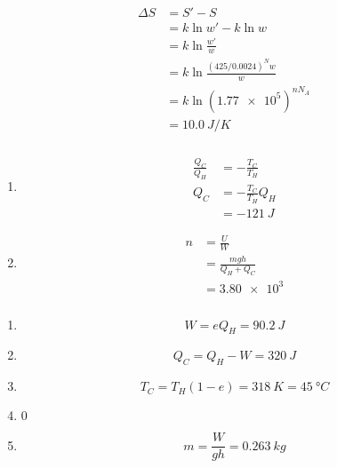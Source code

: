 \documentclass{article}
\begin{document}
\setcounter{subsubsection}{28}
\subsubsection{}

\begin{align*}
  \Delta S & = S' - S                             \\
           & = k \ln w' - k \ln w                 \\
           & = k \ln \frac{w'}{w}                 \\
           & = k \ln \frac{(425 / 0.0024)^N w}{w} \\
           & = k \ln (\num{1.77e5})^{n N_A}       \\
           & = \qty{10.0}{J/K}
\end{align*}

\setcounter{subsubsection}{30}
\subsubsection{}

\begin{enumerate}
  \item

        \begin{align*}
          \frac{Q_C}{Q_H} & = -\frac{T_C}{T_H}     \\
          Q_C             & = -\frac{T_C}{T_H} Q_H \\
                          & = \qty{-121}{J}
        \end{align*}

  \item

        \begin{align*}
          n & = \frac{U}{W}             \\
            & = \frac{m g h}{Q_H + Q_C} \\
            & = \num{3.80e3}
        \end{align*}
\end{enumerate}

\setcounter{subsubsection}{32}
\subsubsection{}

\begin{enumerate}
  \item \[W = e Q_H = \qty{90.2}{J}\]

  \item \[Q_C = Q_H - W = \qty{320}{J}\]

  \item \[T_C = T_H (1 - e) = \qty{318}{K} = \qty{45}{\degree C}\]

  \item $0$

  \item \[m = \frac{W}{g h} = \qty{0.263}{kg}\]
\end{enumerate}
\end{document}
